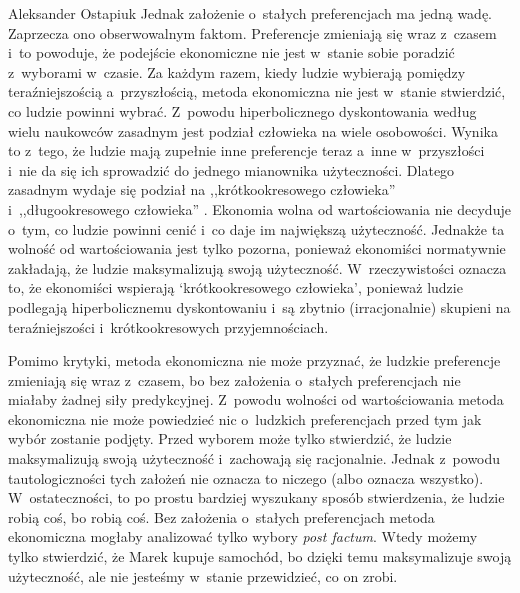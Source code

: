 \begin{artplenv}{Aleksander Ostapiuk}
Jednak założenie o~stałych preferencjach ma jedną wadę. Zaprzecza ono obserwowalnym faktom. Preferencje zmieniają się
wraz z~czasem i~to powoduje, że podejście ekonomiczne nie jest w~stanie sobie poradzić z~wyborami w~czasie. Za każdym
razem, kiedy ludzie wybierają pomiędzy teraźniejszością a~przyszłością, metoda ekonomiczna nie jest w~stanie
stwierdzić, co ludzie powinni wybrać. Z~powodu hiperbolicznego dyskontowania według wielu naukowców zasadnym jest
podział człowieka na wiele osobowości. Wynika to z~tego, że ludzie mają zupełnie inne preferencje
teraz a~inne w~przyszłości i~nie da się ich sprowadzić do jednego mianownika użyteczności.
Dlatego zasadnym wydaje się podział na
,,krótkookresowego człowieka'' i~,,długookresowego człowieka''
\parencites{ostapiuk_human_2018}[więcej na temat koncepcji wielu osobowości][]{ainslie_breakdown_2001}{cowen_self-constraint_1991}{davis_theory_2003}%
{elster_multiple_1986}{frederick_time_2002}{fudenberg_dual-self_2006}{heilmann_rationality_2010-1}%
{loewenstein_out_1996}{schelling_intimate_1980,schelling_self-command_1984,schelling_enforcing_1985,schelling_coping_1996}%
{read_which_2006}{strotz_myopia_1955}{thaler_economic_1981}.
Ekonomia wolna od wartościowania nie decyduje o~tym, co ludzie powinni cenić i~co daje im największą
użyteczność. Jednakże ta wolność od wartościowania jest tylko pozorna, ponieważ ekonomiści normatywnie zakładają, że
ludzie maksymalizują swoją użyteczność. W~rzeczywistości oznacza to, że ekonomiści wspierają `krótkookresowego
człowieka', ponieważ ludzie podlegają hiperbolicznemu dyskontowaniu i~są zbytnio (irracjonalnie) skupieni na
teraźniejszości i~krótkookresowych przyjemnościach.

Pomimo krytyki, metoda ekonomiczna nie może przyznać, że ludzkie preferencje zmieniają się wraz z~czasem, bo bez
założenia o~stałych preferencjach nie miałaby żadnej siły predykcyjnej. Z~powodu wolności od wartościowania metoda
ekonomiczna nie może powiedzieć nic o~ludzkich preferencjach przed tym jak wybór zostanie podjęty. Przed wyborem może
tylko stwierdzić, że ludzie maksymalizują swoją użyteczność i~zachowają się racjonalnie. Jednak z~powodu
tautologiczności tych założeń nie oznacza to niczego (albo oznacza wszystko). W~ostateczności, to po prostu bardziej
wyszukany sposób stwierdzenia, że ludzie robią coś, bo robią coś. Bez założenia o~stałych preferencjach metoda
ekonomiczna mogłaby analizować tylko wybory \textit{post factum}. Wtedy możemy tylko stwierdzić, że Marek kupuje
samochód, bo dzięki temu maksymalizuje swoją użyteczność, ale nie jesteśmy w~stanie przewidzieć, co on zrobi. 


\end{artplenv}
